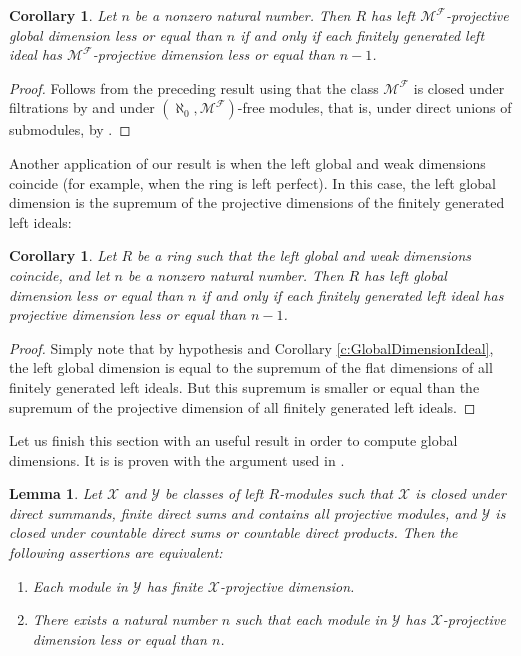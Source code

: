 \documentclass[a4paper,10pt]{amsart}
\newtheorem{lemma}[definition]{Lemma}
\newtheorem{corollary}[definition]{Corollary}
\begin{document}
\begin{corollary}\label{c:Mittag-LefflerDim}
  Let $n$ be a nonzero natural number. Then $R$ has left $\mathcal
  M^{\mathcal F}$-projective global dimension less or equal than $n$
  if and only if each finitely generated left ideal has $\mathcal
  M^{\mathcal F}$-projective dimension less or equal than $n-1$.
\end{corollary}

\begin{proof}
  Follows from the preceding result using that the class $\mathcal
  M^{\mathcal F}$ is closed under filtrations by \cite[Proposition
  1.9]{AngeleriHerbera} and under $(\aleph_0,\mathcal M^{\mathcal
    F})$-free modules, that is, under direct unions
  of submodules, by \cite[Theorem 1]{goodearl}.
\end{proof}

Another application of our result is when the left global
and weak dimensions coincide (for example, when the ring is left
perfect). In this case, the left global dimension is the supremum of
the projective dimensions of the finitely generated left ideals:

\begin{corollary}
  Let $R$ be a ring such that the left global and weak dimensions
  coincide, and let $n$ be a nonzero natural number. Then $R$ has left global
  dimension less or equal than $n$ if and only if each finitely
  generated left ideal has projective dimension less or equal than $n-1$.
\end{corollary}

\begin{proof}
  Simply note that by hypothesis and Corollary
  \ref{c:GlobalDimensionIdeal}, the left global dimension is equal to
  the supremum of the flat dimensions of all finitely generated left
  ideals. But this supremum is smaller or equal than the supremum of
  the projective dimension of all finitely generated left ideals.
\end{proof}

Let us finish this section with an useful result in order to compute
global dimensions. It is is proven with the argument used in
\cite[Corollary VII.2.6]{BeligiannisReiten}.

\begin{lemma}\label{l:FiniteGlobalDimension}
  Let $\mathcal X$ and $\mathcal Y$ be classes of left $R$-modules
  such that $\mathcal X$ is closed under direct summands, finite
  direct sums and contains all projective modules, and $\mathcal Y$ is
  closed under countable direct sums or
  countable direct products. Then the following assertions are
  equivalent:
  \begin{enumerate}
  \item Each module in $\mathcal Y$ has finite $\mathcal X$-projective
    dimension.

  \item There exists a natural number $n$ such that each module in
    $\mathcal Y$ has $\mathcal X$-projective dimension less or equal
    than $n$.
  \end{enumerate}
\end{lemma}
\end{document}
